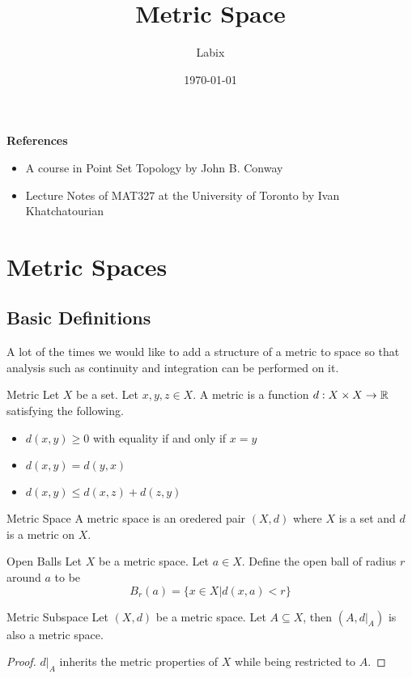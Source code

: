 \documentclass[a4paper]{article}
\title{Metric Space}
\author{Labix}
\date{\today}
\begin{document}
\maketitle
\begin{abstract}
\end{abstract}
\textbf{References}
\begin{itemize}
\item A course in Point Set Topology by John B. Conway
\item Lecture Notes of MAT327 at the University of Toronto by Ivan Khatchatourian
\end{itemize}
\pagebreak
\tableofcontents
\pagebreak
\section{Metric Spaces}
\subsection{Basic Definitions}
A lot of the times we would like to add a structure of a metric to space so that analysis such as continuity and integration can be performed on it. 

\begin{defn}{Metric}{} Let $X$ be a set. Let $x,y,z\in X$. A metric is a function $d:X\times X\to\mathbb{R}$ satisfying the following. 
\begin{itemize}
\item $d(x,y)\geq 0$ with equality if and only if $x=y$
\item $d(x,y)=d(y,x)$
\item $d(x,y)\leq d(x,z)+d(z,y)$
\end{itemize}
\end{defn}

\begin{defn}{Metric Space}{} A metric space is an oredered pair $(X,d)$ where $X$ is a set and $d$ is a metric on $X$. 
\end{defn}

\begin{defn}{Open Balls}{} Let $X$ be a metric space. Let $a\in X$. Define the open ball of radius $r$ around $a$ to be $$B_r(a)=\{x\in X|d(x,a)<r\}$$
\end{defn}

\begin{lmm}{Metric Subspace}{} Let $(X,d)$ be a metric space. Let $A\subseteq X$, then $(A,d|_A)$ is also a metric space. \tcbline
\begin{proof}
$d|_A$ inherits the metric properties of $X$ while being restricted to $A$. 
\end{proof}
\end{lmm}
\end{document}
